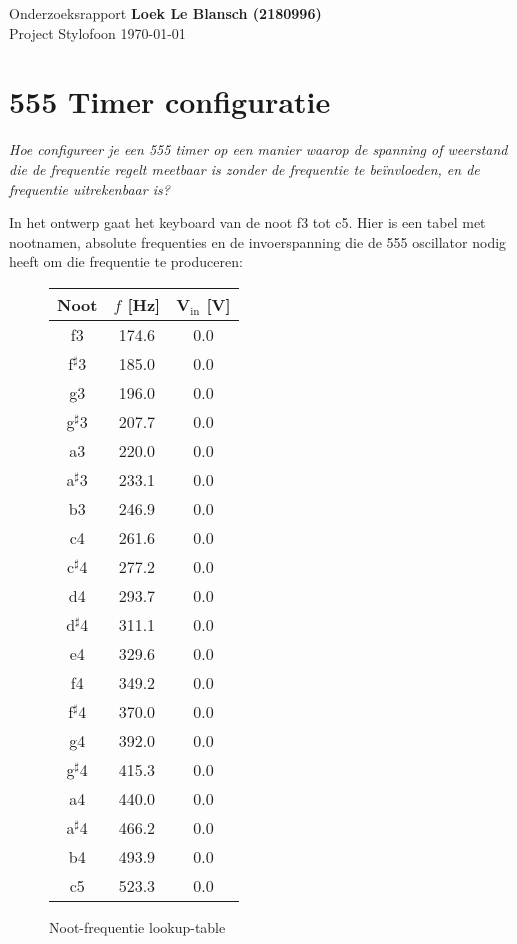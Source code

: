 \documentclass[12pt, a4paper, dutch]{article}
\newcommand{\s}{$^{\sharp}$}
\newcommand{\sub}[1]{$_{\text{#1}}$}
\begin{document}
Onderzoeksrapport \hfill \textbf{Loek Le Blansch (2180996)}\\
Project Stylofoon \hfill \today
\medskip

\tableofcontents

\section{555 Timer configuratie}

\textit{Hoe configureer je een 555 timer op een manier waarop de spanning of
weerstand die de frequentie regelt meetbaar is zonder de frequentie te be\"invloeden,
en de frequentie uitrekenbaar is?}

In het ontwerp gaat het keyboard van de noot f3 tot c5. Hier is een tabel met
nootnamen, absolute frequenties en de invoerspanning die de 555 oscillator nodig
heeft om die frequentie te produceren:

\begin{figure}[H]
\centering
\begin{tabular}{ccc}
\toprule
Noot & $f$ [\si{\hertz}] & V\sub{in} [\si{\volt}]\\
\midrule
f3   & \num{174.6} & \num{0.0} \\
f\s3 & \num{185.0} & \num{0.0} \\
g3   & \num{196.0} & \num{0.0} \\
g\s3 & \num{207.7} & \num{0.0} \\
a3   & \num{220.0} & \num{0.0} \\
a\s3 & \num{233.1} & \num{0.0} \\
b3   & \num{246.9} & \num{0.0} \\
c4   & \num{261.6} & \num{0.0} \\
c\s4 & \num{277.2} & \num{0.0} \\
d4   & \num{293.7} & \num{0.0} \\
d\s4 & \num{311.1} & \num{0.0} \\
e4   & \num{329.6} & \num{0.0} \\
f4   & \num{349.2} & \num{0.0} \\
f\s4 & \num{370.0} & \num{0.0} \\
g4   & \num{392.0} & \num{0.0} \\
g\s4 & \num{415.3} & \num{0.0} \\
a4   & \num{440.0} & \num{0.0} \\
a\s4 & \num{466.2} & \num{0.0} \\
b4   & \num{493.9} & \num{0.0} \\
c5   & \num{523.3} & \num{0.0} \\
\bottomrule
\end{tabular}
\caption{Noot-frequentie lookup-table}
\end{figure}
\end{document}
